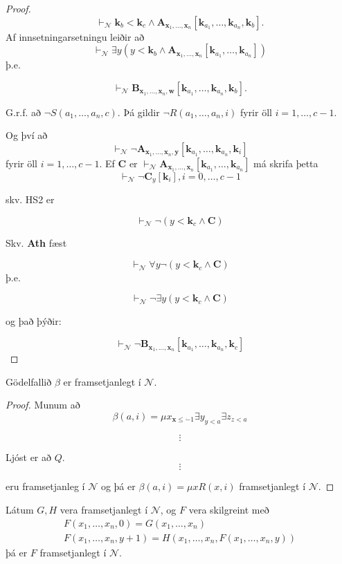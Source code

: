 \documentclass[12pt]{book}
\newcommand{\cN}{\mathcal{N}}
\newcommand{\mb}[1]{\mathbf{#1}}
\newcommand{\bA}{\mathbf{A}}
\newcommand{\bB}{\mathbf{B}}
\newcommand{\bC}{\mathbf{C}}
\newcommand{\bx}{\mathbf{x}}
\newcommand{\bk}{\mathbf{k}}
\newcommand{\by}{\mathbf{y}}
\newcommand{\xxn}{x_1, \dotsc, x_n}
\newcommand{\bxxn}{\bx_1, \dotsc, \bx_n}
\newcommand{\aan}{a_1, \dotsc, a_n}
\newcommand{\bkaan}{\bk_{a_1}, \dotsc,\bk_{a_n}}
\begin{document}
\begin{proof}
  \[\vdash_{\cN} \bk_b < \bk_c \wedge \bA_{\bxxn} [ \bk_{a_1},
  \dotsc,\bk_{a_n},\bk_b] .\] Af innsetningarsetningu leiðir að
  \[\vdash_{\cN} \exists y ( y < \bk_b \wedge \bA_{\bxxn} [ \bk_{a_1},
  \dotsc,\bk_{a_n}])\] þ.e.
 
  \[\vdash_{\cN} \bB_{\bxxn,\mb{w}} [ \bk_{a_1},
  \dotsc,\bk_{a_n},\bk_b] .\]

  G.r.f. að $\lnot S(\aan,c)$. Þá gildir $\lnot R(\aan, i)$ fyrir öll
  $i = 1, \dotsc, c-1$.

  Og því að
  \[\vdash_{\cN} \lnot \bA_{\bxxn,\by} [ \bk_{a_1},
  \dotsc,\bk_{a_n},\bk_i]\] fyrir öll $i = 1, \dotsc, c-1$.  Ef $\bC$
  er \(\vdash_{\cN}\bA_{\bxxn} [ \bk_{a_1}, \dotsc,\bk_{a_n}]\) má
  skrifa þetta
  \[\vdash_{\cN} \lnot \bC_{y} [ \bk_{i}] , i = 0, \dotsc, c-1 \]

  skv. HS2 er

  \[\vdash_{\cN} \lnot (y < \bk_c \wedge \bC)\]

  Skv. \textbf{Ath} fæst

  \[ \vdash_{\cN} \forall y \lnot (y < \bk_c \wedge \bC) \] þ.e.

  \[ \vdash_{\cN} \lnot \exists y (y < \bk_c \wedge \bC) \]

  og það þýðir:

  \[ \vdash_{\cN} \lnot \bB_{\bxxn} [\bkaan, \bk_c] \]
\end{proof}


\begin{setn}[HS7]
  Gödelfallið $\beta$ er framsetjanlegt í $\cN$.
\end{setn}
\begin{proof}
  Munum að
  \[ \beta(a,i) = \mu x_{\bx \leq \dot{-} 1} \exists y_{y<a} \exists z_{z < a}\]

\[\vdots\]

Ljóst er að $Q$.
\[\vdots\]

eru framsetjanleg í $\cN$ og þá er $\beta(a,i) = \mu x R(x,i)$
framsetjanlegt í $\cN$.
\end{proof}

\begin{setn}[HS8]

Látum $G,H$ vera framsetjanlegt í $\cN$, og $F$ vera skilgreint með
\begin{gather*}
  F(\xxn,0) = G( \xxn)\\
  F(\xxn, y+1) = H(\xxn,F(\xxn,y))
\end{gather*}
þá er $F$ framsetjanlegt í $\cN$.
\end{setn}
\end{document}
